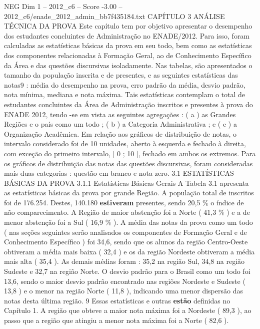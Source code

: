 \begin{textsample}{NEG Dim 1 – 2012\_c6 – Score -3.00 – 2012\_c6/enade\_2012\_admin\_bb7f435184.txt}  \label{ex:f1_neg_254}
CAPÍTULO 3 ANÁLISE TÉCNICA DA PROVA Este capítulo tem por objetivo apresentar o desempenho dos estudantes concluintes de Administração no ENADE/2012.
Para isso, foram calculadas as estatísticas básicas da prova em seu todo, bem como as estatísticas dos componentes relacionadas à Formação Geral, ao de Conhecimento Específico da Área e das questões discursivas isoladamente.
Nas tabelas, são apresentados o tamanho da população inscrita e de presentes, e as seguintes estatísticas das notas9 : média do desempenho na prova, erro padrão da média, desvio padrão, nota mínima, mediana e nota máxima.
Tais estatísticas contemplam o total de estudantes concluintes da Área de Administração inscritos e presentes à prova do ENADE 2012, tendo -se em vista as seguintes agregações : ( a ) as Grandes Regiões e o país como um todo ; ( b ) a Categoria Administrativa ; e ( c ) a Organização Acadêmica.
Em relação aos gráficos de distribuição de notas, o intervalo considerado foi de 10 unidades, aberto à esquerda e fechado à direita, com exceção do primeiro intervalo, [ 0 ; 10 ], fechado em ambos os extremos.
Para os gráficos de distribuição das notas das questões discursivas, foram consideradas mais duas categorias : questão em branco e nota zero. 3.1 ESTATÍSTICAS BÁSICAS DA PROVA 3.1.1 Estatísticas Básicas Gerais A Tabela 3.1 apresenta as estatísticas básicas da prova por grande Região.
A população total de inscritos foi de 176.254.
Destes, 140.180 \textbf{estiveram} presentes, sendo 20,5 \% o índice de não comparecimento.
A Região de maior abstenção foi a Norte ( 41,3 \% ) e a de menor abstenção foi a Sul ( 16,9 \% ).
A média das notas da prova como um todo ( nas seções seguintes serão analisados os componentes de Formação Geral e de Conhecimento Específico ) foi 34,6, sendo que os alunos da região Centro-Oeste obtiveram a média mais baixa ( 32,4 ) e os da região Nordeste obtiveram a média mais alta ( 35,4 ).
As demais médias foram : 35,2 na região Sul, 34,8 na região Sudeste e 32,7 na região Norte.
O desvio padrão para o Brasil como um todo foi 13,6, sendo o maior desvio padrão encontrado nas regiões Nordeste e Sudeste ( 13,8 ) e o menor na região Norte ( 11,8 ), indicando uma menor dispersão das notas desta última região. 9 Essas estatísticas e outras \textbf{estão} definidas no Capítulo 1.
A região que obteve a maior nota máxima foi a Nordeste ( 89,3 ), ao passo que a região que atingiu a menor nota máxima foi a Norte ( 82,6 ).

\end{textsample}
